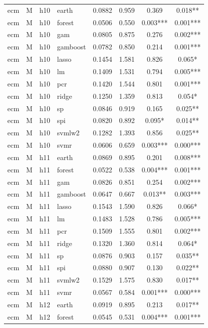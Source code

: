 \begin{ThreePartTable}
\begin{longtable}[t]{llclcccc}
ecm & M & h10 & earth & 0.0882 & 0.959 & 0.369 & 0.018**\\
ecm & M & h10 & forest & 0.0506 & 0.550 & 0.003*** & 0.001***\\
ecm & M & h10 & gam & 0.0805 & 0.875 & 0.276 & 0.002***\\
ecm & M & h10 & gamboost & 0.0782 & 0.850 & 0.214 & 0.001***\\
ecm & M & h10 & lasso & 0.1454 & 1.581 & 0.826 & 0.065*\\
ecm & M & h10 & lm & 0.1409 & 1.531 & 0.794 & 0.005***\\
ecm & M & h10 & pcr & 0.1420 & 1.544 & 0.801 & 0.001***\\
ecm & M & h10 & ridge & 0.1250 & 1.359 & 0.813 & 0.054*\\
ecm & M & h10 & sp & 0.0846 & 0.919 & 0.165 & 0.025**\\
ecm & M & h10 & spi & 0.0820 & 0.892 & 0.095* & 0.014**\\
ecm & M & h10 & svmlw2 & 0.1282 & 1.393 & 0.856 & 0.025**\\
ecm & M & h10 & svmr & 0.0606 & 0.659 & 0.003*** & 0.000***\\
\addlinespace
ecm & M & h11 & earth & 0.0869 & 0.895 & 0.201 & 0.008***\\
ecm & M & h11 & forest & 0.0522 & 0.538 & 0.004*** & 0.001***\\
ecm & M & h11 & gam & 0.0826 & 0.851 & 0.254 & 0.002***\\
ecm & M & h11 & gamboost & 0.0647 & 0.667 & 0.013** & 0.003***\\
ecm & M & h11 & lasso & 0.1543 & 1.590 & 0.826 & 0.066*\\
ecm & M & h11 & lm & 0.1483 & 1.528 & 0.786 & 0.005***\\
ecm & M & h11 & pcr & 0.1509 & 1.555 & 0.801 & 0.002***\\
ecm & M & h11 & ridge & 0.1320 & 1.360 & 0.814 & 0.064*\\
ecm & M & h11 & sp & 0.0876 & 0.903 & 0.157 & 0.035**\\
ecm & M & h11 & spi & 0.0880 & 0.907 & 0.130 & 0.022**\\
ecm & M & h11 & svmlw2 & 0.1529 & 1.575 & 0.830 & 0.017**\\
ecm & M & h11 & svmr & 0.0567 & 0.584 & 0.001*** & 0.000***\\
\addlinespace
ecm & M & h12 & earth & 0.0919 & 0.895 & 0.213 & 0.017**\\
ecm & M & h12 & forest & 0.0545 & 0.531 & 0.004*** & 0.001***\\

\end{longtable}
\end{ThreePartTable}
